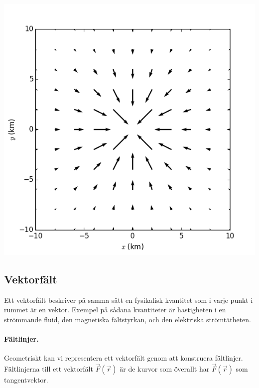 \documentclass[%
oneside,                 %
final,                   %
10pt]{article}
\newenvironment{notice_mdfboxadmon}[1][]{
\begin{notice_mdfboxmdframed}[frametitle=#1]
}
{
\end{notice_mdfboxmdframed}
}
\begin{document}
\begin{notice_mdfboxadmon}
\vspace{6mm}

\centerline{\includegraphics[width=0.8\linewidth]{fig/hojd_gradient.png}}

\vspace{6mm}
\end{notice_mdfboxadmon} %



\subsection*{Vektorfält}

Ett vektorfält beskriver på samma sätt en fysikalisk kvantitet som i varje punkt i rummet är en vektor.  Exempel på sådana kvantiteter är hastigheten i en strömmande fluid, den magnetiska fältstyrkan, och den elektriska strömtätheten.  

\paragraph{Fältlinjer.}
Geometriskt kan vi representera ett vektorfält genom att konstruera fältlinjer. Fältlinjerna till ett vektorfält $\vec{F}(\vec{r})$ är de kurvor som överallt har $\vec{F}(\vec{r})$ som tangentvektor. 
\end{document}
